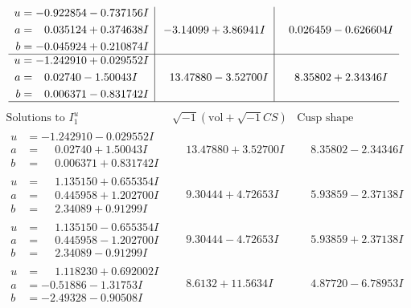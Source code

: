 \documentclass[1p]{elsarticle_modified}
\theoremstyle{definition}
\newcommand{\I}{\sqrt{-1}}
\begin{document}
$$\begin{array}{c|c|c}
\begin{aligned}
u &= -0.922854 - 0.737156 I \\
a &= \phantom{-}0.035124 + 0.374638 I \\
b &= -0.045924 + 0.210874 I\end{aligned}
 & -3.14099 + 3.86941 I & \phantom{-}0.026459 - 0.626604 I \\ \hline\begin{aligned}
u &= -1.242910 + 0.029552 I \\
a &= \phantom{-}0.02740 - 1.50043 I \\
b &= \phantom{-}0.006371 - 0.831742 I\end{aligned}
 & \phantom{-}13.47880 - 3.52700 I & \phantom{-}8.35802 + 2.34346 I\\
 \hline 
 \end{array}$$\newpage$$\begin{array}{c|c|c}  
\text{Solutions to }I^u_{1}& \I (\text{vol} + \sqrt{-1}CS) & \text{Cusp shape}\\
 \hline 
\begin{aligned}
u &= -1.242910 - 0.029552 I \\
a &= \phantom{-}0.02740 + 1.50043 I \\
b &= \phantom{-}0.006371 + 0.831742 I\end{aligned}
 & \phantom{-}13.47880 + 3.52700 I & \phantom{-}8.35802 - 2.34346 I \\ \hline\begin{aligned}
u &= \phantom{-}1.135150 + 0.655354 I \\
a &= \phantom{-}0.445958 + 1.202700 I \\
b &= \phantom{-}2.34089 + 0.91299 I\end{aligned}
 & \phantom{-}9.30444 + 4.72653 I & \phantom{-}5.93859 - 2.37138 I \\ \hline\begin{aligned}
u &= \phantom{-}1.135150 - 0.655354 I \\
a &= \phantom{-}0.445958 - 1.202700 I \\
b &= \phantom{-}2.34089 - 0.91299 I\end{aligned}
 & \phantom{-}9.30444 - 4.72653 I & \phantom{-}5.93859 + 2.37138 I \\ \hline\begin{aligned}
u &= \phantom{-}1.118230 + 0.692002 I \\
a &= -0.51886 - 1.31753 I \\
b &= -2.49328 - 0.90508 I\end{aligned}
 & \phantom{-}8.6132 + 11.5634 I & \phantom{-}4.87720 - 6.78953 I \\ \hline\begin{aligned}

\end{aligned}
\end{array}$$
\end{document}
